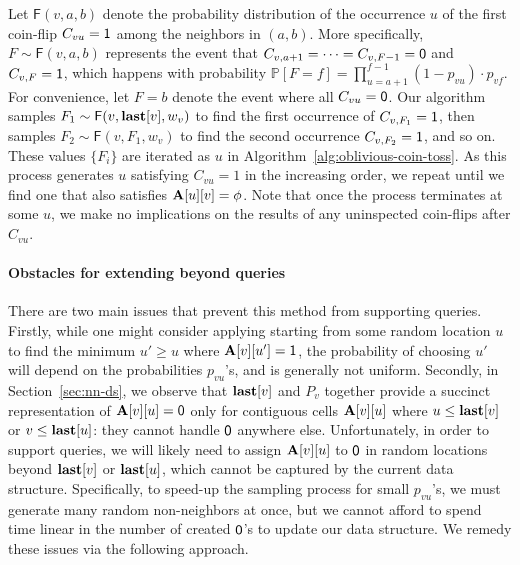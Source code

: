 Let $\mathsf{F}(v,a,b)$ denote the probability distribution of the occurrence $u$ of the first coin-flip $C_{vu} = \mathsf{1}$ among the neighbors in $(a, b)$.
More specifically, $F\sim\mathsf{F}(v,a,b)$ represents the event that $C_{v,a+1}=\cdots=C_{v,F-1}=\mathsf{0}$ and $C_{v,F}=\mathsf{1}$,
which happens with probability $\mathbb P[F=f]=\prod_{u=a+1}^{f-1} (1-p_{vu}) \cdot p_{vf}$.
For convenience, let $F = b$ denote the event where all $C_{vu}=\mathsf{0}$. Our algorithm samples $F_1\sim\mathsf{F}(v,\mathbf{last}[v],w_v)$ to find the first occurrence of $C_{v,F_1} = \mathsf{1}$, then samples $F_2\sim\mathsf{F}(v,F_1,w_v)$ to find the second occurrence $C_{v,F_2} = \mathsf{1}$, and so on.
These values $\{F_i\}$ are iterated as $u$ in Algorithm~\ref{alg:oblivious-coin-toss}.
As this process generates $u$ satisfying $C_{vu}=1$ in the increasing order, we repeat until we find one that also satisfies $\mathbf{A}[u][v]=\phi$.
Note that once the process terminates at some $u$, we make no implications on the results of any uninspected coin-flips after $C_{vu}$.

\paragraph*{Obstacles for extending beyond  queries}
There are two main issues that prevent this method from supporting  queries.
Firstly, while one might consider applying  starting from some random location $u$ to find the minimum $u' \geq u$
where $\mathbf{A}[v][u']=\mathsf{1}$, the probability of choosing $u'$ will depend on the probabilities $p_{vu}$'s, and is generally not uniform.
Secondly, in Section~\ref{sec:nn-ds}, we observe that $\mathbf{last}[v]$ and $P_v$ together provide a succinct representation of $\mathbf{A}[v][u] = \mathsf{0}$
only for contiguous cells $\mathbf{A}[v][u]$ where $u \leq \mathbf{last}[v]$ or $v \leq \mathbf{last}[u]$: they cannot handle $\mathsf{0}$ anywhere else.
Unfortunately, in order to support  queries, we will likely need to assign $\mathbf{A}[v][u]$ to $\mathsf{0}$ in random locations
beyond $\mathbf{last}[v]$ or $\mathbf{last}[u]$, which cannot be captured by the current data structure.
Specifically, to speed-up the sampling process for small $p_{vu}$'s, we must generate many random non-neighbors at once,
but we cannot afford to spend time linear in the number of created $\mathsf{0}$'s to update our data structure.
We remedy these issues via the following approach.
